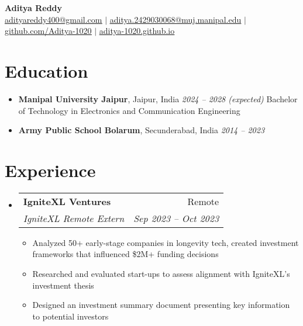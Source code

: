 \documentclass[letterpaper,11pt]{article}
\makeatletter
\newcommand{\resumeItem}[1]{
  \item\small{
    {#1 \vspace{-2pt}}
  }
}
\newcommand{\resumeSubheading}[4]{
  \vspace{-2pt}\item
    \begin{tabular*}{0.97\textwidth}[t]{l@{\extracolsep{\fill}}r}
      \textbf{#1} & #2 \\
      \textit{\small#3} & \textit{\small #4} \\
    \end{tabular*}\vspace{-7pt}
}
\newcommand{\resumeSubHeadingListStart}{\begin{itemize}[leftmargin=0.15in, label={}]}
\newcommand{\resumeSubHeadingListEnd}{\end{itemize}}
\newcommand{\resumeItemListStart}{\begin{itemize}}
\newcommand{\resumeItemListEnd}{\end{itemize}\vspace{-5pt}}
\makeatother
\begin{document}
\begin{center}
    \textbf{\Huge Aditya Reddy} \\ \vspace{1pt}
    \small \href{mailto:adityareddy400@gmail.com}{\underline{adityareddy400@gmail.com}} $|$ 
    \href{mailto:aditya.2429030068@muj.manipal.edu}{\underline{aditya.2429030068@muj.manipal.edu}} $|$
    \href{https://github.com/Aditya-1020}{\underline{github.com/Aditya-1020}} $|$
    \href{https://aditya-1020.github.io}{\underline{aditya-1020.github.io}}
\end{center}

\section{Education}
\begin{itemize}[leftmargin=*, itemsep=1pt]
  \item \textbf{Manipal University Jaipur}, Jaipur, India \hfill \textit{2024 -- 2028 (expected)}  
  \newline Bachelor of Technology in Electronics and Communication Engineering
  \item \textbf{Army Public School Bolarum}, Secunderabad, India \hfill \textit{2014 -- 2023}
\end{itemize}

\section{Experience}
  \resumeSubHeadingListStart

    \resumeSubheading
      {IgniteXL Ventures}{Remote}
      {IgniteXL Remote Extern}{Sep 2023 -- Oct 2023}
      \resumeItemListStart
        \resumeItem{Analyzed 50+ early-stage companies in longevity tech, created investment frameworks that influenced \$2M+ funding decisions}
        \resumeItem{Researched and evaluated start-ups to assess alignment with IgniteXL’s investment thesis}
        \resumeItem{Designed an investment summary document presenting key information to potential investors}
      \resumeItemListEnd

  \resumeSubHeadingListEnd

\end{document}
